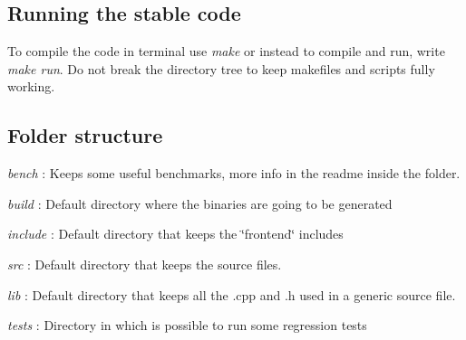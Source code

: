 \subsection*{Running the stable code}

To compile the code in terminal use {\itshape make} or instead to compile and run, write {\itshape make run}. Do not break the directory tree to keep makefiles and scripts fully working.

\subsection*{Folder structure}


\begin{DoxyItemize}
\item {\itshape bench} \+: Keeps some useful benchmarks, more info in the readme inside the folder.
\item {\itshape build} \+: Default directory where the binaries are going to be generated
\item {\itshape include} \+: Default directory that keeps the \char`\"{}frontend\char`\"{} includes
\item {\itshape src} \+: Default directory that keeps the source files.
\item {\itshape lib} \+: Default directory that keeps all the .cpp and .h used in a generic source file.
\item {\itshape tests} \+: Directory in which is possible to run some regression tests 
\end{DoxyItemize}